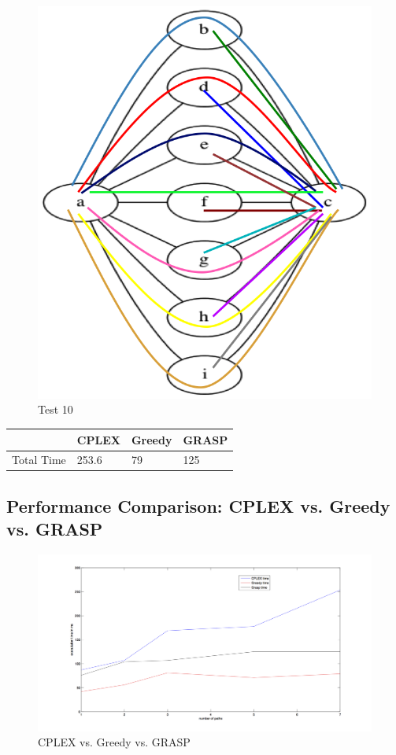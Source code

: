 \documentclass[11pt,a4paper]{article}
\begin{document}
\begin{figure}[H]
  \centering
    \includegraphics[scale=0.7]{inputTest7Hard.png}
  \caption{Test 10}
  \label{fig:test10}
\end{figure}

\begin{tabular}{| l | l | l | l |}
\hline
 & CPLEX & Greedy & GRASP \\ \hline
Total Time & 253.6 & 79 & 125 \\ \hline
\end{tabular}

\subsection{Performance Comparison: CPLEX vs. Greedy vs. GRASP}

\begin{figure}[H]
    \hspace*{-3cm}
	\includegraphics[scale=0.5]{executionTimeGraph.png}
  \caption{CPLEX vs. Greedy vs. GRASP}
  \label{fig:performance}
\end{figure}
\end{document}
